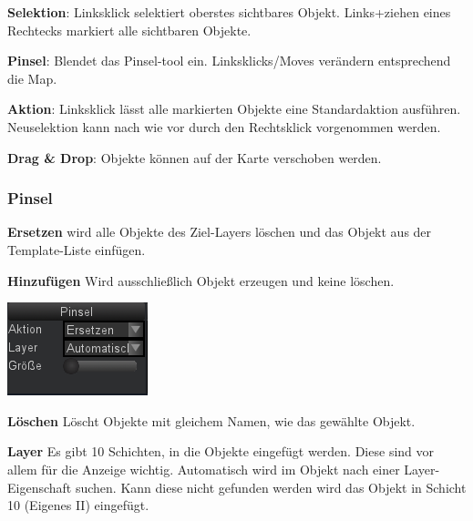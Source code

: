 \documentclass[german,10pt,a4paper,twocolumn,colorscheme=darkblue]{orarticle}
\begin{document}
			\textbf{Selektion}: Linksklick selektiert oberstes sichtbares Objekt. Links+ziehen eines Rechtecks markiert alle sichtbaren Objekte.
			
			\textbf{Pinsel}: Blendet das Pinsel-tool ein. Linksklicks/Moves verändern entsprechend die Map.
			
			\textbf{Aktion}: Linksklick lässt alle markierten Objekte eine Standardaktion ausführen. Neuselektion kann nach wie vor durch den Rechtsklick vorgenommen werden.
			
			\textbf{Drag \& Drop}: Objekte können auf der Karte verschoben werden.
						
		\subsubsection*{Pinsel}
			\begin{minipage}{0.49\linewidth}
			\textbf{Ersetzen} wird alle Objekte des Ziel-Layers löschen und das Objekt aus der Template-Liste einfügen.
			
			\textbf{Hinzufügen} Wird ausschließlich Objekt erzeugen und keine löschen.
			
			\end{minipage}\hspace{1em}
			\begin{minipage}{0.45\linewidth}
				\includegraphics[width=1.0\linewidth]{img/brush}
			\end{minipage}
			
			\textbf{Löschen} Löscht Objekte mit gleichem Namen, wie das gewählte Objekt.

			\textbf{Layer} Es gibt 10 Schichten, in die Objekte eingefügt werden. Diese sind vor allem für die Anzeige wichtig. Automatisch wird im Objekt nach einer Layer-Eigenschaft suchen. Kann diese nicht gefunden werden wird das Objekt in Schicht 10 (Eigenes II) eingefügt.
			
\end{document}
